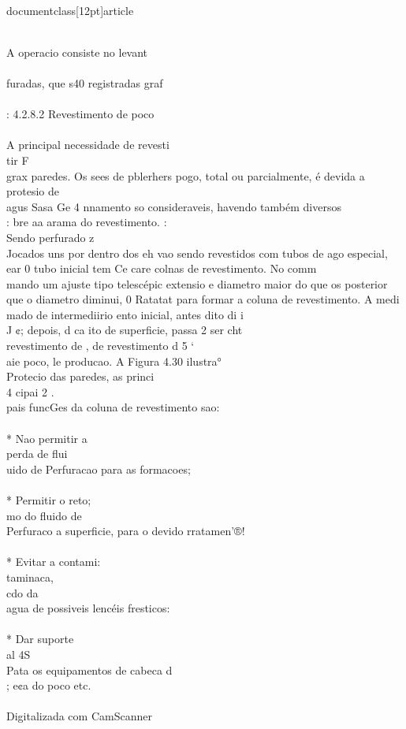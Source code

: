 \\documentclass[12pt]{article}
\begin{document}
\\
A operacio consiste no levant\\
\\
furadas, que s40 registradas graf\\
\\
: 4.2.8.2 Revestimento de poco\\
\\
A principal necessidade de revesti\\
tir F\\
grax paredes. Os sees de pblerhers pogo, total ou parcialmente, é devida a protesio de\\
agus Sasa Ge 4 nnamento so consideraveis, havendo também diversos\\
: bre aa arama do revestimento. :\\
Sendo perfurado z\\
Jocados uns por dentro dos eh vao sendo revestidos com tubos de ago especial,\\
ear 0 tubo inicial tem Ce care colnas de revestimento. No comm\\
mando um ajuste tipo telescépic extensio e diametro maior do que os posterior\\
que o diametro diminui, 0 Ratatat para formar a coluna de revestimento. A medi\\
mado de intermediirio ento inicial, antes dito di i\\
J ¢; depois, d ca ito de superficie, passa 2 ser cht\\
revestimento de , de revestimento d 5 ‘\\
aie poco, le producao. A Figura 4.30 ilustra°\\
Protecio das paredes, as princi\\
4 cipai 2 .\\
pais funcGes da coluna de revestimento sao:\\
\\
* Nao permitir a\\
perda de flui\\
uido de Perfuracao para as formacoes;\\
\\
* Permitir o reto;\\
mo do fluido de\\
Perfuraco a superficie, para o devido rratamen'®!\\
\\
* Evitar a contami:\\
taminaca,\\
cdo da\\
agua de possiveis lencéis fresticos:\\
\\
* Dar suporte\\
al 4S\\
Pata os equipamentos de cabeca d\\
; e¢a do poco etc.\\
\\
Digitalizada com CamScanner\\
\end{document}
